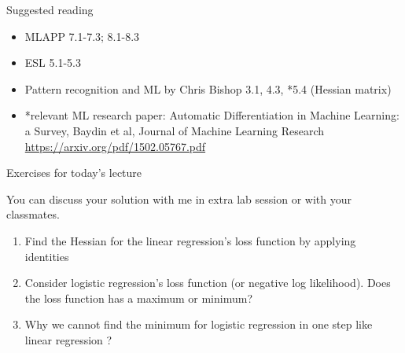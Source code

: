 \documentclass[ignorenonframetext,aspectratio=169]{beamer}
\providecommand{\tightlist}{%
  \setlength{\itemsep}{0pt}\setlength{\parskip}{0pt}}
\begin{document}
\begin{frame}{Suggested reading}
\protect\hypertarget{suggested-reading}{}

\begin{itemize}
\tightlist
\item
  MLAPP 7.1-7.3; 8.1-8.3
\item
  ESL 5.1-5.3
\item
  Pattern recognition and ML by Chris Bishop 3.1, 4.3, *5.4 (Hessian
  matrix)
\item
  *relevant ML research paper: Automatic Differentiation in Machine
  Learning: a Survey, Baydin et al, Journal of Machine Learning Research
  \url{https://arxiv.org/pdf/1502.05767.pdf}
\end{itemize}

\end{frame}

\begin{frame}{Exercises for today's lecture}
\protect\hypertarget{exercises-for-todays-lecture}{}

\footnotesize

You can discuss your solution with me in extra lab session or with your
classmates.

\begin{enumerate}
\item
  Find the Hessian for the linear regression's loss function by applying
  identities
\item
  Consider logistic regression's loss function (or negative log
  likelihood). Does the loss function has a maximum or minimum?
\item
  Why we cannot find the minimum for logistic regression in one step
  like linear regression ?
\end{enumerate}

\end{frame}
\end{document}
